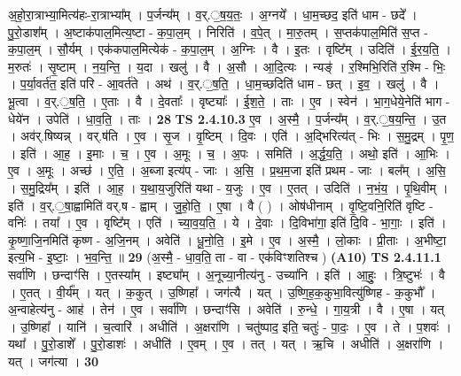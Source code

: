 \documentclass[17pt]{extarticle}
\begin{document}
                  अ॒हो॒रा॒त्राभ्या॒मित्य॑हः-रा॒त्राभ्या᳚म् ।  प॒र्जन्य᳚म् । व॒र्.॒ष॒य॒तः॒ । अ॒ग्नये᳚ । धा॒म॒च्छद॒ इति॑ धाम - छदे᳚ । पु॒रो॒डाश᳚म् । अ॒ष्टाक॑पाल॒मित्य॒ष्टा - क॒पा॒ल॒म् । निरिति॑ । व॒पे॒त् । मा॒रु॒तम् । स॒प्तक॑पाल॒मिति॑ स॒प्त - क॒पा॒ल॒म् । सौ॒र्यम् । एक॑कपाल॒मित्येक॑ - क॒पा॒ल॒म् । अ॒ग्निः । वै । इ॒तः । वृष्टि᳚म् । उदिति॑ । ई॒र॒य॒ति॒ । म॒रुतः॑ । सृ॒ष्टाम् । न॒य॒न्ति॒ । य॒दा । खलु॑ । वै । अ॒सौ । आ॒दि॒त्यः । न्यङ्॑ । र॒श्मिभि॒रिति॑ र॒श्मि - भिः॒ । प॒र्या॒वर्त॑त॒ इति॑ परि - आ॒वर्त॑ते । अथ॑ । व॒र्.॒ष॒ति॒ । धा॒म॒च्छदिति॑ धाम - छत् । इ॒व॒ । खलु॑ । वै । भू॒त्वा ।   व॒र्.॒ष॒ति॒ । ए॒ताः । वै । दे॒वताः᳚ । वृष्ट्याः᳚ । ई॒श॒ते॒ । ताः । ए॒व । स्वेन॑ । भा॒ग॒धेये॒नेति॑ भाग - धेये॑न । उपेति॑ । धा॒व॒ति॒ । ताः । \textbf{  28} \newline
                  \newline
                                \textbf{ TS 2.4.10.3} \newline
                  ए॒व । अ॒स्मै॒ । प॒र्जन्य᳚म् । व॒र्.॒ष॒य॒न्ति॒ । उ॒त । अव॑र्.षिष्यन्न् । वर्.ष॑ति । ए॒व । सृ॒ज ।  वृ॒ष्टिम् । दि॒वः । एति॑ । अ॒द्भिरित्य॑त् - भिः । स॒मु॒द्रम् । पृ॒ण॒ । इति॑ । आ॒ह॒ । इ॒माः । च॒ । ए॒व । अ॒मूः । च॒ । अ॒पः । समिति॑ । अ॒र्द्ध॒य॒ति॒ । अथो॒ इति॑ । आ॒भिः । ए॒व । अ॒मूः । अच्छ॑ । ए॒ति॒ । अ॒ब्जा इत्य॑प् - जाः । अ॒सि॒ । प्र॒थ॒म॒जा इति॑ प्रथम - जाः । बल᳚म् । अ॒सि॒ । स॒मु॒द्रिय᳚म् । इति॑ । आ॒ह॒ । य॒था॒य॒जुरिति॑ यथा - य॒जुः । ए॒व । ए॒तत् । उदिति॑ । न॒भं॒य॒ । पृ॒थि॒वीम् । इति॑ । व॒र्.॒षा॒ह्वामिति॑ वर्.ष - ह्वाम् । जु॒हो॒ति॒ । ए॒षा । वै ( ) । ओष॑धीनाम् । वृ॒ष्टि॒वनि॒रिति॑ वृष्टि - वनिः॑ । तया᳚ । ए॒व । वृष्टि᳚म् । एति॑ । च्या॒व॒य॒ति॒ । ये । दे॒वाः । दि॒विभा॑गा॒ इति॑ दि॒वि - भा॒गाः॒ । इति॑ । कृ॒ष्णा॒जि॒नमिति॑ कृष्ण - अ॒जि॒नम् । अवेति॑ । धू॒नो॒ति॒ । इ॒मे । ए॒व । अ॒स्मै॒ । लो॒काः । प्री॒ताः । अ॒भीष्टा॒ इत्य॒भि - इ॒ष्टाः॒ । भ॒व॒न्ति॒ ॥ \textbf{  29} \newline
                  \newline
                      (अ॒स्मै॒ - धा॒व॒ति॒ ता - वा - एक॑विꣳशतिश्च )  \textbf{(A10)} \newline \newline
                                \textbf{ TS 2.4.11.1} \newline
                  सर्वा॑णि । छन्दाꣳ॑सि । ए॒तस्या᳚म् । इष्ट्या᳚म् । अ॒नूच्या॒नीत्य॑नु - उच्या॑नि । इति॑ । आ॒हुः॒ । त्रि॒ष्टुभः॑ । वै । ए॒तत् । वी॒र्य᳚म् । यत् । क॒कुत् । उ॒ष्णिहा᳚ । जग॑त्यै । यत् । उ॒ष्णि॒ह॒क॒कुभा॒वित्यु॑ष्णिह - क॒कुभौ᳚ । अ॒न्वाहेत्य॑नु - आह॑ । तेन॑ । ए॒व । सर्वा॑णि । छन्दाꣳ॑सि । अवेति॑ । रु॒न्धे॒ । गा॒य॒त्री । वै । ए॒षा । यत् । उ॒ष्णिहा᳚ । यानि॑ । च॒त्वारि॑ । अधीति॑ । अ॒क्षरा॑णि । चतु॑ष्पाद॒ इति॒ चतुः॑ - पा॒दः॒ । ए॒व । ते । प॒शवः॑ । यथा᳚ । पु॒रो॒डाशे᳚ । पु॒रो॒डाशः॑ । अधीति॑ । ए॒वम् । ए॒व । तत् । यत् । ऋ॒चि । अधीति॑ । अ॒क्षरा॑णि । यत् । जग॑त्या । \textbf{  30} \newline
\end{document}
